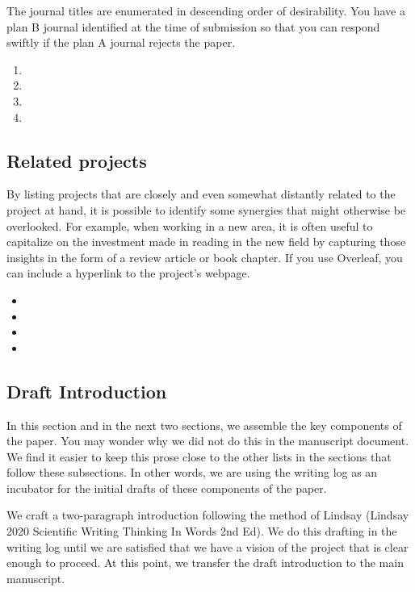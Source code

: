 \documentclass[10pt,letterpaper]{article}
\newcommand{\be}{\begin{enumerate}}
\newcommand{\ee}{\end{enumerate}}
\begin{document}
The journal titles are enumerated in descending order of desirability.
You have a plan B journal identified at the time of submission so that you can respond swiftly if the plan A journal rejects the paper.

\be
  \item 
  \item
  \item
  \item
\ee


\subsection{Related projects}
\label{sub:related-projects}

By listing projects that are closely and even somewhat distantly related to the project at hand, it is possible to identify some synergies that might otherwise be overlooked.
For example, when working in a new area, it is often useful to capitalize on the investment made in reading in the new field by capturing those insights in the form of a review article or book chapter.
If you use Overleaf, you can include a hyperlink to the project's webpage.

\begin{itemize}
  \item
  \item 
  \item 
  \item 
\end{itemize}

\subsection{Draft Introduction}
\label{subsec:Introduction}

In this section and in the next two sections, we assemble the key components of the paper.
You may wonder why we did not do this in the manuscript document.
We find it easier to keep this prose close to the other lists in the sections that follow these subsections.
In other words, we are using the writing log as an incubator for the initial drafts of these components of the paper.

We craft a two-paragraph introduction following the method of Lindsay (Lindsay 2020 Scientific Writing Thinking In Words 2nd Ed).
We do this drafting in the writing log until we are satisfied that we have a vision of the project that is clear enough to proceed.
At this point, we transfer the draft introduction to the main manuscript.
\end{document}
